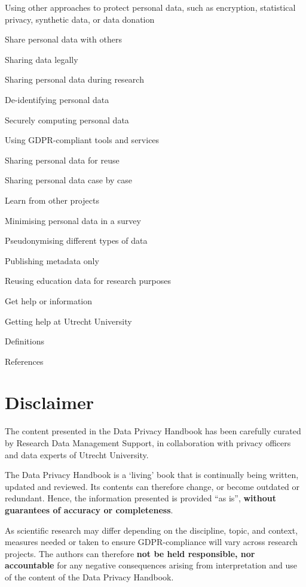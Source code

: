 \documentclass[
]{book}
\begin{document}
Using other approaches to protect personal data, such as
encryption,
statistical privacy,
synthetic data, or
data donation

Share personal data with others

Sharing data legally

Sharing personal data during research

De-identifying personal data

Securely computing personal data

Using GDPR-compliant tools and services

Sharing personal data for reuse

Sharing personal data case by case

Learn from other projects

Minimising personal data in a survey

Pseudonymising different types of data

Publishing metadata only

Reusing education data for research purposes

Get help or information

Getting help at Utrecht University

Definitions

References

\hypertarget{disclaimer}{%
\section{Disclaimer}\label{disclaimer}}

The content presented in the Data Privacy Handbook has been carefully curated by
Research Data Management Support, in collaboration with privacy officers and
data experts of Utrecht University.

The Data Privacy Handbook is a `living' book that is continually being written,
updated and reviewed. Its contents can therefore change, or become outdated or
redundant. Hence, the information presented is provided ``as is'', \textbf{without
guarantees of accuracy or completeness}.

As scientific research may differ depending on the discipline, topic, and
context, measures needed or taken to ensure GDPR-compliance will vary across
research projects. The authors can therefore \textbf{not be held responsible, nor
accountable} for any negative consequences arising from interpretation and use
of the content of the Data Privacy Handbook.
\end{document}
